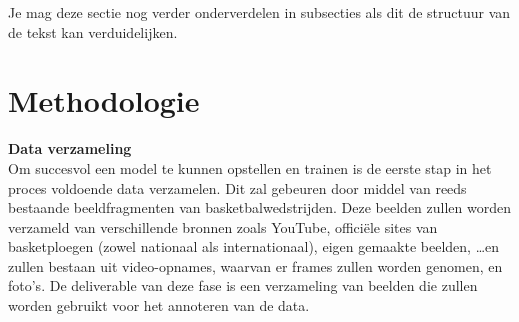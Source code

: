 Je mag deze sectie nog verder onderverdelen in subsecties als dit de structuur van de tekst kan verduidelijken.

\section{Methodologie}%
\label{sec:methodologie}








\textbf{Data verzameling} \\
Om succesvol een model te kunnen opstellen en trainen is de eerste stap in het proces voldoende data verzamelen. Dit zal gebeuren door middel van reeds bestaande beeldfragmenten van basketbalwedstrijden. 
Deze beelden zullen worden verzameld van verschillende bronnen zoals YouTube, officiële sites van basketploegen (zowel nationaal als internationaal), eigen gemaakte beelden, \ldots en zullen bestaan uit video-opnames, waarvan er frames zullen worden genomen, en foto's. 
De deliverable van deze fase is een verzameling van beelden die zullen worden gebruikt voor het annoteren van de data.
\\\\

